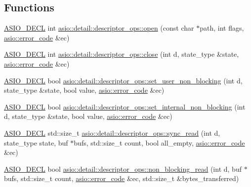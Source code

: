 \subsection*{Functions}
\begin{DoxyCompactItemize}
\item 
\hyperlink{config_8hpp_ab54d01ea04afeb9a8b39cfac467656b7}{A\+S\+I\+O\+\_\+\+D\+E\+C\+L} int \hyperlink{namespaceasio_1_1detail_1_1descriptor__ops_a8801efb10c431989bba3ded2e01adc52}{asio\+::detail\+::descriptor\+\_\+ops\+::open} (const char $\ast$path, int flags, \hyperlink{classasio_1_1error__code}{asio\+::error\+\_\+code} \&ec)
\item 
\hyperlink{config_8hpp_ab54d01ea04afeb9a8b39cfac467656b7}{A\+S\+I\+O\+\_\+\+D\+E\+C\+L} int \hyperlink{namespaceasio_1_1detail_1_1descriptor__ops_adb08bf6a6ad29284d586da2720ba7053}{asio\+::detail\+::descriptor\+\_\+ops\+::close} (int d, state\+\_\+type \&state, \hyperlink{classasio_1_1error__code}{asio\+::error\+\_\+code} \&ec)
\item 
\hyperlink{config_8hpp_ab54d01ea04afeb9a8b39cfac467656b7}{A\+S\+I\+O\+\_\+\+D\+E\+C\+L} bool \hyperlink{namespaceasio_1_1detail_1_1descriptor__ops_a45d5bc45c4575bb02d8aea7a2785e698}{asio\+::detail\+::descriptor\+\_\+ops\+::set\+\_\+user\+\_\+non\+\_\+blocking} (int d, state\+\_\+type \&state, bool value, \hyperlink{classasio_1_1error__code}{asio\+::error\+\_\+code} \&ec)
\item 
\hyperlink{config_8hpp_ab54d01ea04afeb9a8b39cfac467656b7}{A\+S\+I\+O\+\_\+\+D\+E\+C\+L} bool \hyperlink{namespaceasio_1_1detail_1_1descriptor__ops_a9162476dcac561f880711939b461ccf7}{asio\+::detail\+::descriptor\+\_\+ops\+::set\+\_\+internal\+\_\+non\+\_\+blocking} (int d, state\+\_\+type \&state, bool value, \hyperlink{classasio_1_1error__code}{asio\+::error\+\_\+code} \&ec)
\item 
\hyperlink{config_8hpp_ab54d01ea04afeb9a8b39cfac467656b7}{A\+S\+I\+O\+\_\+\+D\+E\+C\+L} std\+::size\+\_\+t \hyperlink{namespaceasio_1_1detail_1_1descriptor__ops_ac2ccb11d1dc712151611a4fbe25aa5ac}{asio\+::detail\+::descriptor\+\_\+ops\+::sync\+\_\+read} (int d, state\+\_\+type state, buf $\ast$bufs, std\+::size\+\_\+t count, bool all\+\_\+empty, \hyperlink{classasio_1_1error__code}{asio\+::error\+\_\+code} \&ec)
\item 
\hyperlink{config_8hpp_ab54d01ea04afeb9a8b39cfac467656b7}{A\+S\+I\+O\+\_\+\+D\+E\+C\+L} bool \hyperlink{namespaceasio_1_1detail_1_1descriptor__ops_a3b54b218ce98d1842878e7562b49537f}{asio\+::detail\+::descriptor\+\_\+ops\+::non\+\_\+blocking\+\_\+read} (int d, buf $\ast$bufs, std\+::size\+\_\+t count, \hyperlink{classasio_1_1error__code}{asio\+::error\+\_\+code} \&ec, std\+::size\+\_\+t \&bytes\+\_\+transferred)

\end{DoxyCompactItemize}
